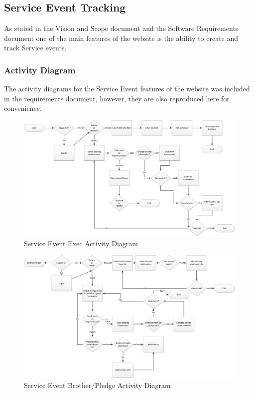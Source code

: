 \documentclass{article}
\begin{document}
\subsection{Service Event Tracking}

As stated in the Vision and Scope document and the Software Requirements document one of the main features of the website is the ability to create and track Service events.

\subsubsection{Activity Diagram}

The activity diagrams for the Service Event features of the website was included in the requirements document, however, they are also reproduced here for convenience.

\FloatBarrier
\begin{figure}
\centering
\includegraphics[scale=.65]{img/activityDiagrams/serviceEventActivity1}
\caption{Service Event Exec Activity Diagram}
\label{fig:serviceEventExecActivityDiagram}
\end{figure}
\FloatBarrier

\FloatBarrier
\begin{figure}
\centering
\includegraphics[scale=.65]{img/activityDiagrams/serviceEventActivity2}
\caption{Service Event Brother/Pledge Activity Diagram}
\label{fig:serviceEventBrotherActivityDiagram}
\end{figure}
\FloatBarrier
\end{document}
